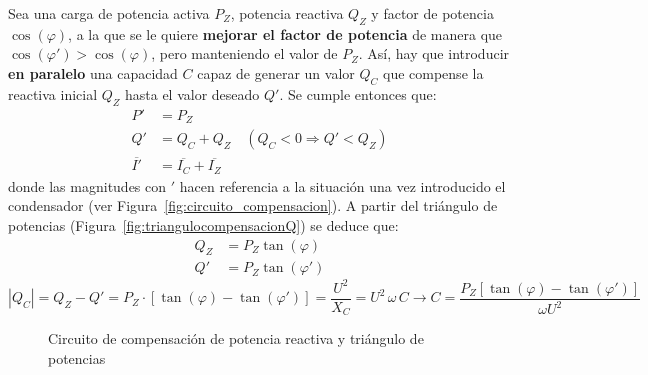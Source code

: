 Sea una carga de potencia activa $P_Z$, potencia reactiva $Q_Z$ y
factor de potencia $\cos(\varphi)$, a la que se le quiere
\textbf{mejorar el factor de potencia} de manera que
$\cos (\varphi') > \cos (\varphi)$, pero manteniendo el valor de
$P_Z$. Así, hay que introducir \textbf{en paralelo} una capacidad $C$
capaz de generar un valor $Q_C$ que compense la reactiva inicial $Q_Z$
hasta el valor deseado $Q'$. Se cumple entonces que:
\begin{align*}
  P' &= P_Z\\
  Q' &= Q_C + Q_Z \quad (Q_C<0\Rightarrow Q' < Q_Z)\\
  \overline{I'} &= \overline{I_C} + \overline{I_Z}
\end{align*}
donde las magnitudes con $'$ hacen referencia a la situación una vez
introducido el condensador (ver
Figura~\ref{fig:circuito_compensacion}). A partir del triángulo de
potencias (Figura~\ref{fig:triangulocompensacionQ}) se deduce que:
\begin{align*}
  Q_Z &= P_Z \tan (\varphi)\\
  Q'&= P_Z \tan (\varphi')
\end{align*}
\begin{equation}\label{eq:compensacion_Q_mono}
  |Q_C| = Q_Z - Q' = P_Z\cdot \left[\tan (\varphi) - \tan (\varphi')\right]=\dfrac{U^2}{X_C}={U^2\,\omega\,C}\rightarrow \boxed{C=\frac{P_Z \left[\tan (\varphi) - \tan (\varphi')\right]}{\omega U^2}}
\end{equation}
	
	
\begin{figure}
  \centering
  \hfil {}
  \caption{Circuito de compensación de potencia reactiva y triángulo
    de potencias}
  \label{fig:circuitocompensacionreactiva}
\end{figure}
	

